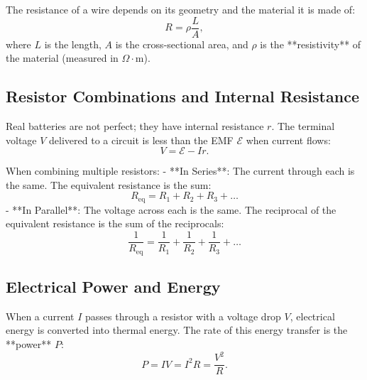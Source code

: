 The resistance of a wire depends on its geometry and the material it is made of:
\begin{equation}
    R = \rho \frac{L}{A},
\end{equation}
where $L$ is the length, $A$ is the cross-sectional area, and $\rho$ is the **resistivity** of the material (measured in $\Omega\cdot\text{m}$).

\subsection{Resistor Combinations and Internal Resistance}

Real batteries are not perfect; they have internal resistance $r$. The terminal voltage $V$ delivered to a circuit is less than the EMF $\mathcal{E}$ when current flows:
\begin{equation}
    V = \mathcal{E} - I r.
\end{equation}

When combining multiple resistors:
- **In Series**: The current through each is the same. The equivalent resistance is the sum:
  \begin{equation}
      R_{\text{eq}} = R_1 + R_2 + R_3 + \dots
  \end{equation}
- **In Parallel**: The voltage across each is the same. The reciprocal of the equivalent resistance is the sum of the reciprocals:
  \begin{equation}
      \frac{1}{R_{\text{eq}}} = \frac{1}{R_1} + \frac{1}{R_2} + \frac{1}{R_3} + \dots
  \end{equation}

\subsection{Electrical Power and Energy}

When a current $I$ passes through a resistor with a voltage drop $V$, electrical energy is converted into thermal energy. The rate of this energy transfer is the **power** $P$:
\begin{equation}
    P = I V = I^2 R = \frac{V^2}{R}.
\end{equation}

